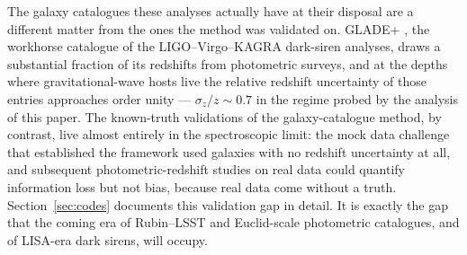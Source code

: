 The galaxy catalogues these analyses actually have at their disposal
are a different matter from the ones the method was validated on.
GLADE+ \citep{Dalya:2021ewn}, the workhorse catalogue of the
LIGO--Virgo--KAGRA dark-siren analyses, draws a substantial fraction
of its redshifts from photometric surveys, and at the depths where
gravitational-wave hosts live the relative redshift uncertainty of
those entries approaches order unity --- $\sigma_z/z \sim 0.7$ in the
regime probed by the analysis of this paper.
The known-truth validations of the galaxy-catalogue method, by
contrast, live almost entirely in the spectroscopic limit: the mock
data challenge that established the \citet{Gray:2019ksv} framework
used galaxies with no redshift uncertainty at all, and subsequent
photometric-redshift studies on real data
\citep{Turski:2023lxq} could quantify
information loss but not bias, because real data come without a
truth.
Section~\ref{sec:codes} documents this validation gap in detail.  It
is exactly the gap that the coming era of Rubin--LSST and
Euclid-scale photometric catalogues, and of LISA-era dark sirens,
will occupy.

